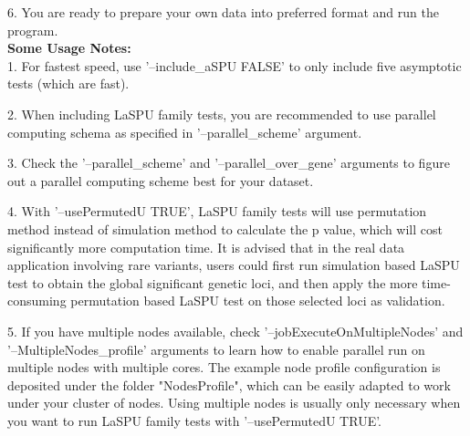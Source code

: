 6.	You are ready to prepare your own data into preferred format and run the program.\\

\textbf{Some Usage Notes:}\\
1.	For fastest speed, use '--include\_aSPU FALSE' to only include five asymptotic tests (which are fast).

2.	When including LaSPU family tests, you are recommended to use parallel computing schema as specified in '--parallel\_scheme' argument.

3.	Check the '--parallel\_scheme' and '--parallel\_over\_gene' arguments to figure out a parallel computing scheme best for your dataset.

4.	With '--usePermutedU TRUE', LaSPU family tests will use permutation method instead of simulation method to calculate the p value, which will cost significantly more computation time. It is advised that in the real data application involving rare variants, users could first run simulation based LaSPU test to obtain the global significant genetic loci, and then apply the more time-consuming permutation based LaSPU test on those selected loci as validation.

5.	If you have multiple nodes available, check '--jobExecuteOnMultipleNodes' and '--MultipleNodes\_profile' arguments to learn how to enable parallel run on multiple nodes with multiple cores. The example node profile configuration is deposited under the folder "NodesProfile", which can be easily adapted to work under your cluster of nodes. Using multiple nodes is usually only necessary when you want to run LaSPU family tests with '--usePermutedU TRUE'. 



